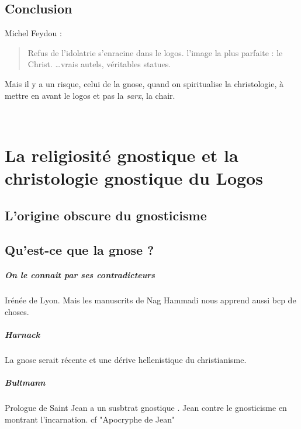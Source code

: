 \subsection{Conclusion}

Michel Feydou : 
\begin{quote}
    Refus de l'idolatrie s'enracine dans le logos. 
    l'image la plus parfaite : le Christ. \ldots vrais autels, véritables statues.
\end{quote}
  
  Mais il y a un risque, celui de la gnose, quand on spiritualise la christologie, à mettre en avant le logos et pas la \textit{sarx}, la chair.
  
 ~
  \hypertarget{la-religiosituxe9-gnostique-et-la-christologie-gnostique-du-logos}{%
  \section{La religiosité gnostique et la christologie gnostique du
  Logos}\label{la-religiosituxe9-gnostique-et-la-christologie-gnostique-du-logos}}

  
  
  
    
    \subsection{L'origine obscure du gnosticisme}
    
  
    
    \subsection{Qu'est-ce que la gnose ?}
    
   \subparagraph{On le connait par ses contradicteurs} Irénée de Lyon. Mais les manuscrits de Nag Hammadi nous apprend aussi bcp de choses.
   
   \subparagraph{Harnack} La gnose serait récente et une dérive hellenistique du christianisme.
   
   \subparagraph{Bultmann} Prologue de Saint Jean a un susbtrat gnostique . Jean contre le gnosticisme en montrant l'incarnation. cf  "Apocryphe de Jean" 

   
   
